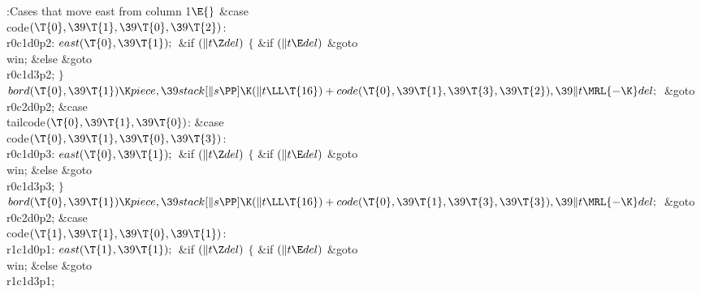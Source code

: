 \B{}:Cases that move east from column 1\X${}\E{}$%
\6
\4\&{case} \\{code}${}(\T{0},\39\T{1},\39\T{0},\39\T{2}){}$:\5
\\{r0c1d0p2}:\5
${}\\{east}(\T{0},\39\T{1});{}$\6
\&{if} ${}(\|t\Z\\{del}){}$\5
${}\{{}$\5
\1\&{if} ${}(\|t\E\\{del}){}$\1\5
\&{goto} \\{win};\5
\2\&{else}\1\5
\&{goto} \\{r0c1d3p2};\5
\2${}\}{}$\2\6
${}\\{bord}(\T{0},\39\T{1})\K\\{piece},\39\\{stack}[\|s\PP]\K(\|t\LL\T{16})+%
\\{code}(\T{0},\39\T{1},\39\T{3},\39\T{2}),\39\|t\MRL{-{\K}}\\{del};{}$\6
\&{goto} \\{r0c2d0p2};\6
\4\&{case} \\{tailcode}${}(\T{0},\39\T{1},\39\T{0}){}$:\5
\&{case} \\{code}${}(\T{0},\39\T{1},\39\T{0},\39\T{3}){}$:\5
\\{r0c1d0p3}:\5
${}\\{east}(\T{0},\39\T{1});{}$\6
\&{if} ${}(\|t\Z\\{del}){}$\5
${}\{{}$\5
\1\&{if} ${}(\|t\E\\{del}){}$\1\5
\&{goto} \\{win};\5
\2\&{else}\1\5
\&{goto} \\{r0c1d3p3};\5
\2${}\}{}$\2\6
${}\\{bord}(\T{0},\39\T{1})\K\\{piece},\39\\{stack}[\|s\PP]\K(\|t\LL\T{16})+%
\\{code}(\T{0},\39\T{1},\39\T{3},\39\T{3}),\39\|t\MRL{-{\K}}\\{del};{}$\6
\&{goto} \\{r0c2d0p2};\6
\4\&{case} \\{code}${}(\T{1},\39\T{1},\39\T{0},\39\T{1}){}$:\5
\\{r1c1d0p1}:\5
${}\\{east}(\T{1},\39\T{1});{}$\6
\&{if} ${}(\|t\Z\\{del}){}$\5
${}\{{}$\5
\1\&{if} ${}(\|t\E\\{del}){}$\1\5
\&{goto} \\{win};\5
\2\&{else}\1\5
\&{goto} \\{r1c1d3p1};\5

